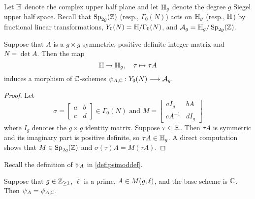 \documentclass{amsart}
\begin{document}
Let $\mathbb{H}$ denote the complex upper half plane and let $\mathbb{H}_g$ denote the degree $g$ Siegel upper half space. Recall that $\operatorname{Sp}_{2g}(\mathbb{Z})$ (resp., $\Gamma_0(N)$) acts on $\mathbb{H}_g$ (resp., $\mathbb{H}$) by fractional linear transformations,
 $Y_0(N) = \mathbb{H}/\Gamma_0(N)$, and $\mathcal{A}_g = \mathbb{H}_g/\operatorname{Sp}_{2g}(\mathbb{Z})$.
\begin{lemma}\label{lem:psi-A-n}
Suppose that $A$ is a $g \times g$ symmetric, positive definite integer matrix and $N = \det A$.
Then the map \[
  \mathbb{H} \to \mathbb{H}_g, \quad  \tau \mapsto \tau A
\]
induces a morphism of $\mathbb{C}$-schemes
$
  {\psi}_{A, \mathbb{C}}: Y_0(N) \longrightarrow \mathcal{A}_g.
$
\end{lemma}

\begin{proof}
Let
\[
\sigma = \begin{bmatrix} a & b \\ c & d \end{bmatrix} \in \Gamma_0(N) \text{ and } M = \begin{bmatrix} aI_g & bA \\ cA^{-1} & dI_g \end{bmatrix}
\]
where $I_g$ denotes the $g \times g$ identity matrix.
Suppose $\tau \in \mathbb{H}$. Then $\tau A$ is symmetric and its imaginary part is positive definite, so $\tau A \in \mathbb{H}_g$.
A direct computation shows that $M \in\operatorname{Sp}_{2g}(\mathbb{Z})$
and  $\sigma(\tau)A = M(\tau A)$.
\end{proof}

Recall the definition of $\psi_{A}$ in \eqref{def:psimoddef}.

\begin{proposition}\label{prop:psimod-over-c}
Suppose that $g\in\mathbb{Z}_{\ge 1}$, $\ell$ is a prime, $A \in M(g,\ell)$, and
 the base scheme is $\mathbb{C}$. Then $\psi_{A} = {\psi}_{A, \mathbb{C}}$.
\end{proposition}
\end{document}
